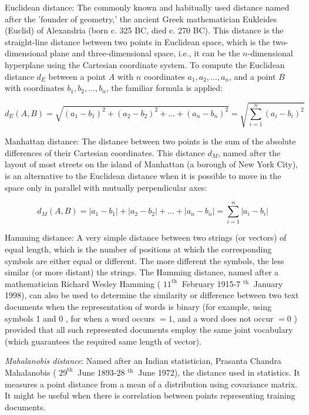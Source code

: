 Euclidean distance: The commonly known and habitually used distance named after the 'founder of geometry,' the ancient Greek mathematician Eukleides (Euclid) of Alexandria (born c. 325 BC, died c. 270 BC). This distance is the straight-line distance between two points in Euclidean space, which is the two-dimensional plane and three-dimensional space, i.e., it can be the $n$-dimensional hyperplane using the Cartesian coordinate system. To compute the Euclidean distance $d_{E}$ between a point $A$ with $n$ coordinates $a_{1}, a_{2}, \ldots, a_{n}$, and a point $B$ with coordinates $b_{1}, b_{2}, \ldots, b_{n}$, the familiar formula is applied:

\begin{equation*}
d_{E}(A, B)=\sqrt{\left(a_{1}-b_{1}\right)^{2}+\left(a_{2}-b_{2}\right)^{2}+\ldots+\left(a_{n}-b_{n}\right)^{2}}=\sqrt{\sum_{i=1}^{n}\left(a_{i}-b_{i}\right)^{2}} \tag{6.1}
\end{equation*}


Manhattan distance: The distance between two points is the sum of the absolute differences of their Cartesian coordinates. This distance $d_{M}$, named after the layout of most streets on the island of Manhattan (a borough of New York City), is an alternative to the Euclidean distance when it is possible to move in the space only in parallel with mutually perpendicular axes:


\begin{equation*}
d_{M}(A, B)=\left|a_{1}-b_{1}\right|+\left|a_{2}-b_{2}\right|+\ldots+\left|a_{n}-b_{n}\right|=\sum_{i=1}^{n}\left|a_{i}-b_{i}\right| \tag{6.2}
\end{equation*}

Hamming distance: A very simple distance between two strings (or vectors) of equal length, which is the number of positions at which the corresponding symbols are either equal or different. The more different the symbols, the less similar (or more distant) the strings. The Hamming distance, named after a mathematician Richard Wesley Hamming ( $11^{\text {th }}$ February 1915-7 ${ }^{\text {th }}$ January 1998), can also be used to determine the similarity or difference between two text documents when the representation of words is binary (for example, using symbols 1 and 0 , for when a word occurs $=1$, and a word does not occur $=0$ ) provided that all such represented documents employ the same joint vocabulary (which guarantees the required same length of vector).

\textit{Mahalanobis distance}: Named after an Indian statistician, Prasanta Chandra Mahalanobis ( $29^{\text {th }}$ June 1893-28 ${ }^{\text {th }}$ June 1972), the distance used in statistics. It measures a point distance from a mean of a distribution using covariance matrix. It might be useful when there is correlation between points representing training documents.

